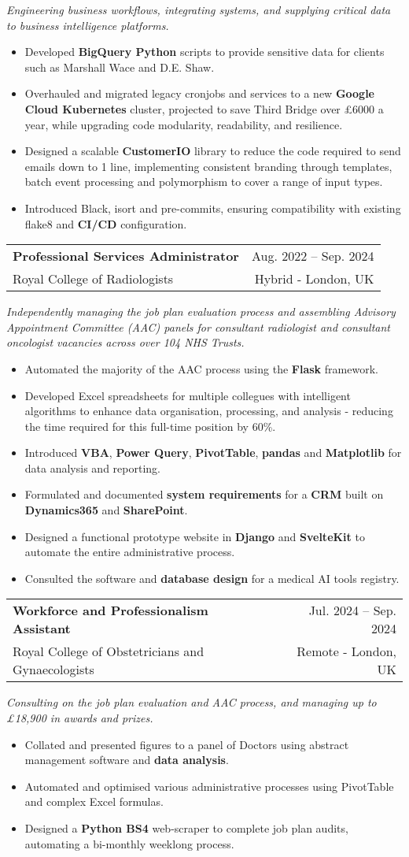 \documentclass[letterpaper,11pt]{article}
\makeatletter
\newcommand{\resumeItem}[1]{
  \item\small{
    {#1 \vspace{-2pt}}
  }
}
\newcommand{\resumeSubtitle}[1]{
  \vspace{5pt}
  \small{
      \textit{#1 \vspace{-7pt}}
  }
}
\newcommand{\resumeSubheading}[4]{
  \vspace{-2pt}\item
    \begin{tabular*}{0.97\textwidth}[t]{l@{\extracolsep{\fill}}r}
      \textbf{#1} & #2 \\
      {\small#3} & {\small #4} \\
    \end{tabular*}\vspace{-7pt}
}
\newcommand{\resumeItemListStart}{\begin{itemize}}
\newcommand{\resumeItemListEnd}{\end{itemize}\vspace{-5pt}}
\makeatother
\begin{document}
      \resumeSubtitle{Engineering business workflows, integrating systems, and supplying critical data to business intelligence platforms.}
      \resumeItemListStart
\resumeItem{Developed \textbf{BigQuery Python} scripts to provide sensitive data for clients such as Marshall Wace and D.E. Shaw.}
\resumeItem{Overhauled and migrated legacy cronjobs and services to a new \textbf{Google Cloud Kubernetes} cluster, projected to save Third Bridge over £6000 a year, while upgrading code modularity, readability, and resilience.}
\resumeItem{Designed a scalable \textbf{CustomerIO} library to reduce the code required to send emails down to 1 line, implementing consistent branding through templates, batch event processing and polymorphism to cover a range of input types.}
\resumeItem{Introduced Black, isort and pre-commits, ensuring compatibility with existing flake8 and \textbf{CI/CD} configuration.}
      \resumeItemListEnd
  
    \resumeSubheading
      {Professional Services Administrator}{Aug. 2022 -- Sep. 2024}
      {Royal College of Radiologists}{Hybrid - London, UK}
      
      \resumeSubtitle{Independently managing the job plan evaluation process and assembling Advisory Appointment Committee (AAC) panels for consultant radiologist and consultant oncologist vacancies across over 104 NHS Trusts.}
      \resumeItemListStart
\resumeItem{Automated the majority of the AAC process using the \textbf{Flask} framework.}
\resumeItem{Developed Excel spreadsheets for multiple collegues with intelligent algorithms to enhance data organisation, processing, and analysis - reducing the time required for this full-time position by 60\%.}
\resumeItem{Introduced \textbf{VBA}, \textbf{Power Query}, \textbf{PivotTable}, \textbf{pandas} and \textbf{Matplotlib} for data analysis and reporting.}
\resumeItem{Formulated and documented \textbf{system requirements} for a \textbf{CRM} built on \textbf{Dynamics365} and \textbf{SharePoint}.}
\resumeItem{Designed a functional prototype website in \textbf{Django} and \textbf{SvelteKit} to automate the entire administrative process.}
\resumeItem{Consulted the software and \textbf{database design} for a medical AI tools registry.}
      \resumeItemListEnd
      

    \resumeSubheading
      {Workforce and Professionalism Assistant}{Jul. 2024 -- Sep. 2024}
      {Royal College of Obstetricians and Gynaecologists}{Remote - London, UK}
      
      \resumeSubtitle{Consulting on the job plan evaluation and AAC process, and managing up to £18,900 in awards and prizes.}
      \resumeItemListStart
\resumeItem{Collated and presented figures to a panel of Doctors using abstract management software and \textbf{data analysis}.}
\resumeItem{Automated and optimised various administrative processes using PivotTable and complex Excel formulas.}
\resumeItem{Designed a \textbf{Python BS4} web-scraper to complete job plan audits, automating a bi-monthly weeklong process.}
  \resumeItemListEnd
      
\end{document}
